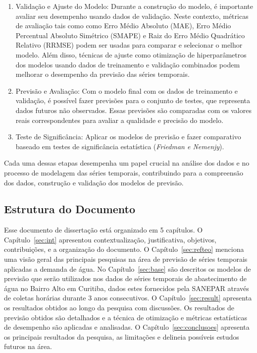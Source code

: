 \begin{enumerate}
	\item {Validação e Ajuste do Modelo}: Durante a construção do modelo, é importante avaliar seu desempenho usando dados de validação. Neste contexto, métricas de avaliação tais como como Erro Médio Absoluto (MAE), Erro Médio Percentual Absoluto Simétrico (SMAPE) e Raiz do Erro Médio Quadrático Relativo (RRMSE) podem ser usadas para comparar e selecionar o melhor modelo. Além disso, técnicas de ajuste como otimização de hiperparâmetros dos modelos usando dados de treinamento e validação combinados podem melhorar o desempenho da previsão das séries temporais.
	
	\item {Previsão e Avaliação}: Com o modelo final com os dados de treinamento e validação, é possível fazer previsões para o conjunto de testes, que representa dados futuros não observados. Essas previsões são comparadas com os valores reais correspondentes para avaliar a qualidade e precisão do modelo.
	
	\item {Teste de Significância}: Aplicar os modelos de previsão e fazer comparativo baseado em testes de significância estatística (\textit{Friedman e Nemenjy}).
	
	
	
\end{enumerate}

Cada uma dessas etapas desempenha um papel crucial na análise dos dados e no processo de modelagem das séries temporais, contribuindo para a compreensão dos dados, construção e validação dos modelos de previsão.

\subsection{Estrutura do Documento} \label{subsec:estrutura}

Esse documento de dissertação está organizado em 5 capítulos. O Capítulo~\ref{sec:int}  apresentou contextualização, justificativa, objetivos, contribuições, e a organização do documento.  O Capítulo~\ref{sec:refteo} menciona uma visão geral das principais pesquisas na área de previsão de séries temporais aplicadas a demanda de água. No Capítulo~\ref{sec:base} são descritos os modelos de previsão que serão utilizados nos dados de séries temporais de abastecimento de água no Bairro Alto em Curitiba, dados estes fornecidos pela SANEPAR através de coletas horárias durante 3 anos consecutivos. O Capítulo~\ref{sec:result} apresenta os resultados obtidos ao longo da pesquisa com discussões. Os resultados de previsão obtidos são detalhados e a técnica de otimização e métricas estatísticas de desempenho são aplicadas e analisadas. O Capítulo~\ref{sec:conclusoes} apresenta os principais resultados da pesquisa, as limitações e delineia possíveis estudos futuros na área. 
